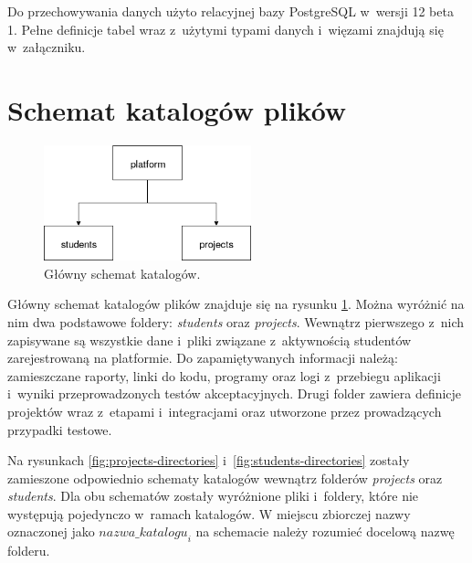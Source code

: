 Do przechowywania danych użyto relacyjnej bazy PostgreSQL w~wersji 12 beta 1.
Pełne definicje tabel wraz z~użytymi typami danych i~więzami znajdują się w~załączniku.


\section{Schemat katalogów plików}
\label{directories}

\begin{figure}[h]
    \centering
    \includegraphics[width = 6cm]{chapter05/platform_main_dirs.png}
    \caption{Główny schemat katalogów.}
    \label{fig:platform-main-directories}
\end{figure}

Główny schemat katalogów plików znajduje się na rysunku \ref{fig:platform-main-directories}.
Można wyróżnić na nim dwa podstawowe foldery: \textit{students} oraz \textit{projects}.
Wewnątrz pierwszego z~nich zapisywane są wszystkie dane i~pliki związane z~aktywnością studentów zarejestrowaną na platformie.
Do zapamiętywanych informacji należą: zamieszczane raporty, linki do kodu, programy oraz logi z~przebiegu aplikacji i~wyniki przeprowadzonych testów akceptacyjnych.
Drugi folder zawiera definicje projektów wraz z~etapami i~integracjami oraz utworzone przez prowadzących przypadki testowe.

Na rysunkach \ref{fig:projects-directories} i~\ref{fig:students-directories} zostały zamieszone odpowiednio schematy katalogów wewnątrz folderów \textit{projects} oraz \textit{students}.
Dla obu schematów zostały wyróżnione pliki i~foldery, które nie występują pojedynczo w~ramach katalogów.
W miejscu zbiorczej nazwy oznaczonej jako ${nazwa\_katalogu}_{i}$ na schemacie należy rozumieć docelową nazwę folderu.

